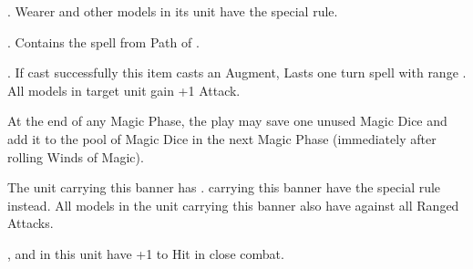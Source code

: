 \endpricelist

\armyenchanteditems

\startpricelist

 . Wearer and other \rnf{} models in its unit have the \distracting{} special rule.

\endpricelist

\armyarcaneitems

\startpricelist

 . Contains the spell \necromancyspelltwo{} from Path of \necromancy .

 . If cast successfully this item
casts an Augment, Lasts one turn spell with range . All \undead{} models in target unit gain +1 Attack.

 At the end of any Magic Phase, the play may save one unused Magic Dice and add it to the pool of Magic Dice in the next Magic Phase (immediately after rolling Winds of Magic).

\endpricelist

\armymagicbanners

\startpricelist

 The unit carrying this banner has \bodyguard{\vampirelord , \vampirehero}. \vampireknights{} carrying this banner have the \stubborn{} special rule instead. All models in the unit carrying this banner also have  against all Ranged Attacks.

 \barrowknights , \barrowguards{} and \barrowkings{} in this unit have +1 to Hit in close combat.

\endpricelist


\armylist

\lordstitle


